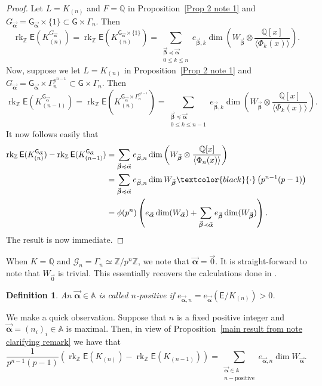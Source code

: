\documentclass{amsart}
\newcommand{\edit}[1]{\textcolor{black}{#1}}
\newtheorem{definition}[theorem]{Definition}
\numberwithin{equation}{section}
\theoremstyle{remark}
\newcommand{\val}{\vec{\boldsymbol{\alpha}}}
\newcommand{\veb}{\vec{\boldsymbol{\beta}}}
\newcommand{\rk}{\operatorname{rk}}
\newcommand{\EC}{\mathsf{E}}
\newcommand{\cG}{\mathcal{G}}
\newcommand{\sG}{\mathsf{G}}
\newcommand{\Z}{\mathbb{Z}}
\newcommand{\A}{\mathbb{A}}
\newcommand{\Q}{\mathbb{Q}}
\theoremstyle{plain} %
\begin{document}
\begin{proof}
Let $L= K_{(n)}$ and $F=\Q$ in Proposition~\ref{Prop 2 note 1} and $G_{\val} = \sG_{\val} \times \{1\} \subset \sG \times \Gamma_n$.
Then
\[
\rk_{\Z} \EC(K_{(n)}^{G_{\val}}) = \rk_{\Z} \EC(K_{(n)}^{\sG_{\val} \times \{1\}}) = \sum_{\substack{\veb \preccurlyeq \val\\ 0 \leq k \leq n}} e_{\veb, k} \dim \left( W_{\veb} \otimes \frac{\Q[x]}{\langle \Phi_k(x)\rangle}\right).
\]
Now, suppose we let $L= K_{(n)}$ in Proposition~\ref{Prop 2 note 1} and $G_{\val} = \sG_{\val} \times \Gamma_n^{p^{n-1}} \subset \sG \times \Gamma_n$.
Then
\[
\rk_{\Z} \EC(K_{(n-1)}^{\sG_{\val}}) = \rk_{\Z} \EC(K_{(n)}^{\sG_{\val} \times \Gamma_n^{p^{n-1}}}) = \sum_{\substack{\veb \preccurlyeq \val\\ 0 \leq k \leq n-1}} e_{\veb, k} \dim \left( W_{\veb} \otimes \frac{\Q[x]}{\langle \Phi_k(x)\rangle}\right).
\]
It now follows easily that
\begin{align*}
\rk_{\Z} \EC(K_{(n)}^{\sG_{\val}}) - \rk_{\Z} \EC(K_{(n-1)}^{\sG_{\val}}) & = \sum_{\veb \preccurlyeq \val} e_{\veb, n} \dim \left( W_{\veb} \otimes \frac{\Q[x]}{\langle \Phi_n(x)\rangle}\right)\\
& = \sum_{\veb \preccurlyeq \val} e_{\veb, n} \dim W_{\veb} \edit{\cdot} \left(p^{n-1}(p-1)\right)\\
& = \phi(p^n) \left( e_{\val}\dim(W_{\val}) + \sum_{\veb \prec \val} e_{\veb} \dim(W_{\veb})\right).
\end{align*}
The result is now immediate.
\end{proof}

When $K=\Q$ and $\cG_n = \Gamma_n \simeq \Z/p^n\Z$, we note that  $\val = \vec{0}$.
It is straight-forward to note that $W_{\vec{0}}$ is trivial.
This essentially recovers the calculations done in \cite[p.~14 just before Lemma~4.2]{Lei23}.


\begin{definition}
An $\val\in \A$ is called \emph{$n$-positive }if $e_{\val,n} = e_{\val}(\EC/K_{(n)})>0$.
\end{definition}

We make a quick observation.
Suppose that $n$ is a fixed positive integer and $\val = (n_i)_i \in \A$ is maximal.
Then, in view of Proposition~\ref{main result from note clarifying remark} we have that
\[
\frac{1}{p^{n-1}(p-1)} \left( \rk_{\Z}\EC(K_{(n)}) - \rk_{\Z}\EC(K_{(n-1)}) \right) = \sum_{\substack{\val\in \A \\ n-\text{positive}} }e_{\val,n}\dim W_{\val}.
\]
\end{document}
